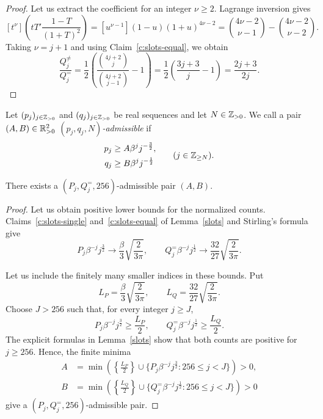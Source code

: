 \begin{proof}
Let us extract the coefficient for an integer $\nu\ge2$.
Lagrange inversion gives
\[
 [t^\nu]\left(tT'\frac{1-T}{(1+T)^2}\right)
 =[u^{\nu-1}](1-u)(1+u)^{4\nu-2}
 =\binom{4\nu-2}{\nu-1}-\binom{4\nu-2}{\nu-2}.
\]
Taking $\nu=j+1$ and using Claim~\ref{c:slots-equal}, we obtain
\[
 \frac{Q_j^{\ne}}{Q_j^{=}}
 =\frac12\left(\frac{\binom{4j+2}{j}}{\binom{4j+2}{j-1}}-1\right)
 =\frac12\left(\frac{3j+3}{j}-1\right)=\frac{2j+3}{2j}.
\]
\end{proof}

\begin{definition}\label{def:admissible-pairs}
Let $(p_j)_{j\in\mathbb Z_{>0}}$ and $(q_j)_{j\in\mathbb Z_{>0}}$ be real sequences and let $N\in\mathbb Z_{>0}$.
We call a pair $(A,B)\in\mathbb R_{>0}^2$ \textit{$(p_j,q_j,N)$-admissible} if
\[
\begin{aligned}
 p_j&\ge A\beta^j j^{-\frac32},\\
 q_j&\ge B\beta^j j^{-\frac12}
\end{aligned}
\qquad(j\in\mathbb Z_{\ge N}).
\]
\end{definition}

\begin{lemma}\label{lem:slot-bounds}
There exists a $(P_j,Q_j^{=},256)$-admissible pair $(A,B)$.
\end{lemma}
\begin{proof}
Let us obtain positive lower bounds for the normalized counts.
Claims~\ref{c:slots-single} and~\ref{c:slots-equal} of Lemma~\ref{slots} and Stirling's formula give
\[
 P_j\beta^{-j}j^{\frac{3}{2}}\longrightarrow
 \frac\beta3\sqrt{\frac{2}{3\pi}},\qquad
 Q_j^{=}\beta^{-j}j^{\frac{1}{2}}\longrightarrow
 \frac{32}{27}\sqrt{\frac{2}{3\pi}}.
\]

Let us include the finitely many smaller indices in these bounds.
Put
\[
 L_P=\frac\beta3\sqrt{\frac{2}{3\pi}},\qquad
 L_Q=\frac{32}{27}\sqrt{\frac{2}{3\pi}}.
\]
Choose $J>256$ such that, for every integer $j\ge J$,
\[
 P_j\beta^{-j}j^{\frac32}\ge\frac{L_P}{2},\qquad
 Q_j^{=}\beta^{-j}j^{\frac12}\ge\frac{L_Q}{2}.
\]
The explicit formulas in Lemma~\ref{slots} show that both counts are positive for $j\ge256$.
Hence, the finite minima
\[
\begin{aligned}
 A&=\min\left(\left\{\frac{L_P}{2}\right\}
       \cup\{P_j\beta^{-j}j^{\frac32}:256\le j<J\}\right)>0,\\
 B&=\min\left(\left\{\frac{L_Q}{2}\right\}
       \cup\{Q_j^{=}\beta^{-j}j^{\frac12}:256\le j<J\}\right)>0
\end{aligned}
\]
give a $(P_j,Q_j^{=},256)$-admissible pair.
\end{proof}

